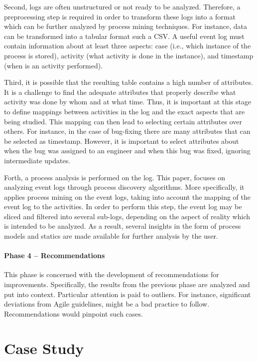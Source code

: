 Second, logs are often unstructured or not ready to be analyzed. Therefore, a preprocessing step is required in order to transform these logs into a format which can be further analyzed by process mining techniques. For instance, data can be transformed into a tabular format such a CSV. A useful event log must contain information about at least three aspects: case (i.e., which instance of the process is stored), activity (what activity is done in the instance), and timestamp (when is an activity performed).  

Third, it is possible that the resulting table contains a high number of attributes. It is a challenge to find the adequate attributes that properly describe what activity was done by whom and at what time. Thus, it is important at this stage to define mappings between activities in the log and the exact aspects that are being studied. This mapping can then lead to selecting certain attributes over others. For instance, in the case of bug-fixing there are many attributes that can be selected as timestamp. However, it is important to select attributes about when the bug was assigned to an engineer and when this bug was fixed, ignoring intermediate updates.  

Forth, a process analysis is performed on the log. This paper, focuses on analyzing event logs through process discovery algorithms. More specifically, it applies process mining on the event logs, taking into account the mapping of the event log to the activities. In order to perform this step, the event log may be sliced and filtered into several sub-logs, depending on the aspect of reality which is intended to be analyzed. As a result, several insights in the form of process models and statics are made available for further analysis by the user. 

\paragraph{Phase 4 – Recommendations}

This phase is concerned with the development of recommendations for improvements. Specifically, the results from the previous phase are analyzed and put into context. Particular attention is paid to outliers. For instance, significant deviations from Agile guidelines, might be a bad practice to follow. Recommendations would pinpoint such cases.  

\section{Case Study}

